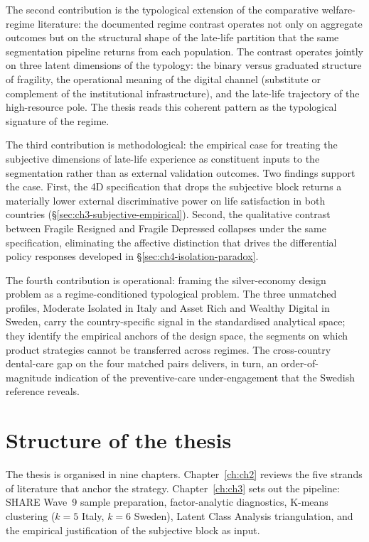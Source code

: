 The second contribution is the typological extension of the comparative welfare-regime literature: the documented regime contrast operates not only on aggregate outcomes but on the structural shape of the late-life partition that the same segmentation pipeline returns from each population. The contrast operates jointly on three latent dimensions of the typology: the binary versus graduated structure of fragility, the operational meaning of the digital channel (substitute or complement of the institutional infrastructure), and the late-life trajectory of the high-resource pole. The thesis reads this coherent pattern as the typological signature of the regime.

The third contribution is methodological: the empirical case for treating the subjective dimensions of late-life experience as constituent inputs to the segmentation rather than as external validation outcomes. Two findings support the case. First, the 4D specification that drops the subjective block returns a materially lower external discriminative power on life satisfaction in both countries (\S\ref{sec:ch3-subjective-empirical}). Second, the qualitative contrast between Fragile Resigned and Fragile Depressed collapses under the same specification, eliminating the affective distinction that drives the differential policy responses developed in \S\ref{sec:ch4-isolation-paradox}.

The fourth contribution is operational: framing the silver-economy design problem as a regime-conditioned typological problem. The three unmatched profiles, Moderate Isolated in Italy and Asset Rich and Wealthy Digital in Sweden, carry the country-specific signal in the standardised analytical space; they identify the empirical anchors of the design space, the segments on which product strategies cannot be transferred across regimes. The cross-country dental-care gap on the four matched pairs delivers, in turn, an order-of-magnitude indication of the preventive-care under-engagement that the Swedish reference reveals.

\section{Structure of the thesis}
\label{sec:ch1-roadmap}

 The thesis is organised in nine chapters. Chapter~\ref{ch:ch2} reviews the five strands of literature that anchor the strategy. Chapter~\ref{ch:ch3} sets out the pipeline: SHARE Wave~9 sample preparation, factor-analytic diagnostics, K-means clustering ($k = 5$ Italy, $k = 6$ Sweden), Latent Class Analysis triangulation, and the empirical justification of the subjective block as input.

